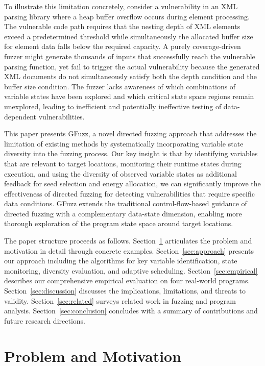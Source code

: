 \documentclass[review]{elsarticle}
\begin{document}
To illustrate this limitation concretely, consider a vulnerability in an XML parsing library where a heap buffer overflow occurs during element processing. The vulnerable code path requires that the nesting depth of XML elements exceed a predetermined threshold while simultaneously the allocated buffer size for element data falls below the required capacity. A purely coverage-driven fuzzer might generate thousands of inputs that successfully reach the vulnerable parsing function, yet fail to trigger the actual vulnerability because the generated XML documents do not simultaneously satisfy both the depth condition and the buffer size condition. The fuzzer lacks awareness of which combinations of variable states have been explored and which critical state space regions remain unexplored, leading to inefficient and potentially ineffective testing of data-dependent vulnerabilities.

This paper presents GFuzz, a novel directed fuzzing approach that addresses the limitation of existing methods by systematically incorporating variable state diversity into the fuzzing process. Our key insight is that by identifying variables that are relevant to target locations, monitoring their runtime states during execution, and using the diversity of observed variable states as additional feedback for seed selection and energy allocation, we can significantly improve the effectiveness of directed fuzzing for detecting vulnerabilities that require specific data conditions. GFuzz extends the traditional control-flow-based guidance of directed fuzzing with a complementary data-state dimension, enabling more thorough exploration of the program state space around target locations.

The paper structure proceeds as follows. Section~\ref{sec:problem} articulates the problem and motivation in detail through concrete examples. Section~\ref{sec:approach} presents our approach including the algorithms for key variable identification, state monitoring, diversity evaluation, and adaptive scheduling. Section~\ref{sec:empirical} describes our comprehensive empirical evaluation on four real-world programs. Section~\ref{sec:discussion} discusses the implications, limitations, and threats to validity. Section~\ref{sec:related} surveys related work in fuzzing and program analysis. Section~\ref{sec:conclusion} concludes with a summary of contributions and future research directions.

\section{Problem and Motivation}
\label{sec:problem}
\end{document}
